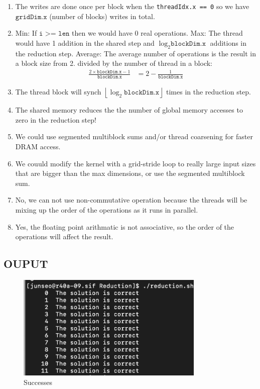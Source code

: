 \documentclass[../main.tex]{subfiles}
\begin{document}
\begin{enumerate}
    \item The writes are done once per block when the \texttt{threadIdx.x == 0} so
    we have $\texttt{gridDim.x}$ (number of blocks) writes in total.

    \item Min: If $\texttt{i >= len}$ then we would have 0 real operations. Max: The thread would 
    have 1 addition in the shared step and $\log_2{\texttt{blockDim.x}}$ additions in the reduction
    step. Average: The average number of operations is the result in a block size from 2. divided by
    the number of thread in a block:
    \begin{align*}
        \frac{2 \times \texttt{blockDim.x} - 1}{\texttt{blockDim.x}}
        &= 2 - \frac{1}{\texttt{blockDim.x}}
    \end{align*}
    \newcommand{\floor}[1]{\left\lfloor#1\right\rfloor}
        \item The thread block will synch $\floor{\log_2{\texttt{blockDim.x}}}$ times in the reduction
        step.

    \item The shared memory reduces the the number of global memory accesses to zero in the 
    reduction step!

    \item We could use segmented multiblock sums and/or thread coarsening for faster DRAM access.

    \item We couuld modify the kernel with a grid-stride loop to really large input sizes that are
    bigger than the max dimensions, or use the segmented multiblock sum.

    \item No, we can not use non-commutative operation because the threads will be mixing up the
    order of the operations as it runs in parallel.

    \item Yes, the floating point arithmatic is not associative, so the order of the operations
    will affect the result.

\end{enumerate}

\newpage
\subsection*{OUPUT}
\begin{figure}[ht]
    \centering
    \includegraphics[width=0.8\textwidth]{reduction.png}
    \caption{Successes}
    \label{fig:texthistogram}
\end{figure}
\end{document}
